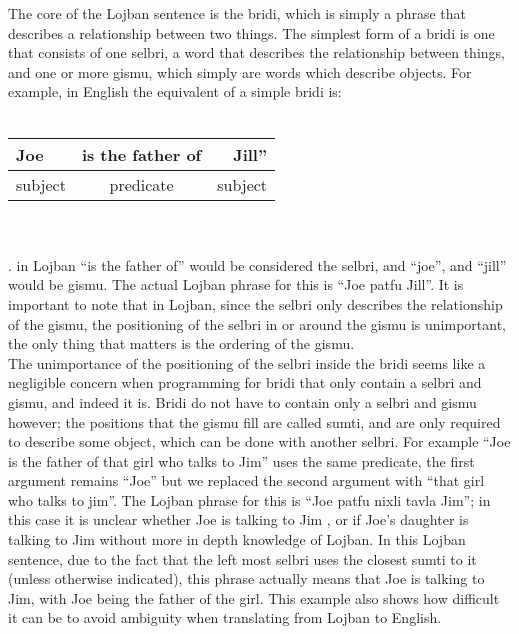 \documentclass[11pt,letterpaper]{article}
\begin{document}
	The core of the Lojban sentence is the bridi, which is simply a phrase that describes a relationship between two things. The simplest form of a bridi is one that consists of one selbri, a word that describes the relationship between things, and one or more gismu, which simply are words which describe objects. For example, in English the equivalent of a simple bridi is:\\\\ 
\begin{tabular}{|l|c|r|}
Joe& is the father of &Jill”\\
\hline{}
subject&predicate&subject\\
\end{tabular}\\\\
. in Lojban “is the father of” would be considered the selbri, and “joe”, and “jill” would be gismu. The actual Lojban phrase for this is “Joe patfu Jill”. It is important to note that in Lojban, since the selbri only describes the relationship of the gismu, the positioning of the selbri in or around the gismu is unimportant, the only thing that matters is the ordering of the gismu. \\

	The unimportance of the positioning of the selbri inside the bridi seems like a negligible concern when programming for bridi that only contain a selbri and gismu, and indeed it is. Bridi do not have to contain only a selbri and gismu however; the positions that the gismu fill are called sumti, and are only required to describe some object, which can be done with another selbri. For example “Joe is the father of that girl who talks to Jim” uses the same predicate, the first argument remains “Joe” but we replaced the second argument with “that girl who talks to jim”. The Lojban phrase for this is “Joe patfu nixli tavla Jim”; in this case it is unclear whether Joe is talking to Jim , or if Joe’s daughter is talking to Jim without more in depth knowledge of Lojban. In this Lojban sentence, due to the fact that the left most selbri uses the closest sumti to it (unless otherwise indicated), this phrase actually means that Joe is talking to Jim, with Joe being the father of the girl. This example also shows how difficult it can be to avoid ambiguity when translating from Lojban to English. \\
\end{document}
